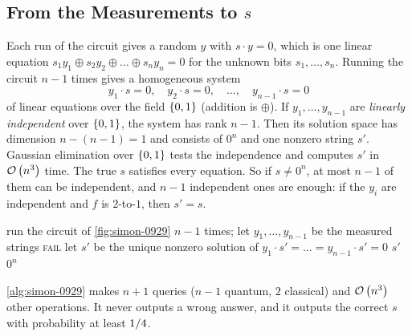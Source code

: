 \subsection{From the Measurements to \texorpdfstring{$s$}{s}}

Each run of the circuit gives a random $y$ with $s \cdot y = 0$, which is one linear equation
$s_1 y_1 \oplus s_2 y_2 \oplus \dots \oplus s_n y_n = 0$ for the unknown bits $s_1, \dots, s_n$. Running
the circuit $n - 1$ times gives a homogeneous system
\[y_1 \cdot s = 0, \quad y_2 \cdot s = 0, \quad \dots, \quad y_{n-1} \cdot s = 0\]
of linear equations over the field $\left\lbrace0,1\right\rbrace$ (addition is $\oplus$). If $y_1, \dots, y_{n-1}$ are
\emph{linearly independent} over $\left\lbrace0,1\right\rbrace$, the system has rank $n - 1$. Then its solution space has
dimension $n - (n-1) = 1$ and consists of $0^n$ and one nonzero string $s'$. Gaussian elimination over
$\left\lbrace0,1\right\rbrace$ tests the independence and computes $s'$ in $\mathcal{O}\left(n^3\right)$ time. The true $s$ satisfies every
equation. So if $s \neq 0^n$, at most $n - 1$ of them can be independent, and $n - 1$ independent ones
are enough: if the $y_i$ are independent and $f$ is $2$-to-$1$, then $s' = s$.

\begin{algorithm}[ht]
    \caption{Simon's algorithm}
    \label{alg:simon-0929}
    \begin{algorithmic}[1]
        \State run the circuit of \cref{fig:simon-0929} $n - 1$ times; let $y_1, \dots, y_{n-1}$ be the measured strings
         
        \State \Return \textsc{fail}
        \EndIf
        \State let $s'$ be the unique nonzero solution of $y_1 \cdot s' = \dots = y_{n-1} \cdot s' = 0$
         
        \State \Return $s'$ 
        \Else
        \State \Return $0^n$ 
        \EndIf
    \end{algorithmic}
\end{algorithm}

\begin{theorem}\label{thm:simon-0929}
    \cref{alg:simon-0929} makes $n + 1$ queries ($n - 1$ quantum, $2$ classical) and $\mathcal{O}\left(n^3\right)$ other
    operations. It never outputs a wrong answer, and it outputs the correct $s$ with probability at least
    $1/4$.
\end{theorem}

